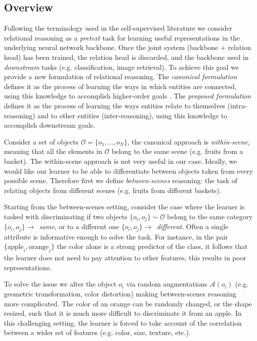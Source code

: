 \documentclass{article}
\begin{document}
\subsection{Overview}

Following the terminology used in the self-supervised literature \citep{jing2020self} we consider relational reasoning as a \emph{pretext} task for learning useful representations in the underlying neural network backbone. Once the joint system (backbone + relation head) has been trained, the relation head is discarded, and the backbone used in \emph{downstream} tasks (e.g. classification, image retrieval). To achieve this goal we provide a new formulation of relational reasoning. The \emph{canonical formulation} defines it as the process of learning the ways in which entities are connected, using this knowledge to accomplish higher-order goals \citep{santoro2017simple, santoro2018relational}. The \emph{proposed formulation} defines it as the process of learning the ways entities relate to themselves (intra-reasoning) and to other entities (inter-reasoning), using this knowledge to accomplish downstream goals.

Consider a set of objects $\mathcal{O} = \{ o_1, \ldots , o_N \}$, the canonical approach is \emph{within-scene}, meaning that all the elements in $\mathcal{O}$ belong to the same scene (e.g. fruits from a basket). The within-scene approach is not very useful in our case. Ideally, we would like our learner to be able to differentiate between objects taken from every possible scene. Therefore first we define \emph{between-scenes} reasoning: the task of relating objects from different scenes (e.g. fruits from different baskets).

Starting from the between-scenes setting, consider the case where the learner is tasked with discriminating if two objects $\{o_i, o_j\} \sim \mathcal{O}$ belong to the same category $\{o_i, o_j\} \rightarrow$~\emph{same}, or to a different one $\{o_i, o_j\} \rightarrow$~\emph{different}. Often a single attribute is informative enough to solve the task. For instance, in the pair $\{\text{apple}_i, \text{orange}_j \}$ the color alone is a strong predictor of the class, it follows that the learner does not need to pay attention to other features, this results in poor representations. 

To solve the issue we alter the object $o_i$ via random augmentations $\mathcal{A}(o_i)$ (e.g. geometric transformation, color distortion) making between-scenes reasoning more complicated. The color of an orange can be randomly changed, or the shape resized, such that it is much more difficult to discriminate it from an apple. In this challenging setting, the learner is forced to take account of the correlation between a wider set of features (e.g. color, size, texture, etc.).
\end{document}
